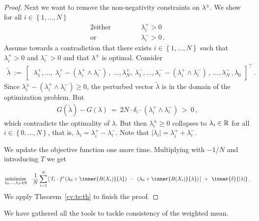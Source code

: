 \begin{proof}
  Next we want to remove the non-negativity constraints on $\lambda^\pm$.
  We show 
  for all $i \in \left\{ 1,\ldots,N \right\}$
\begin{alignat*}{2}
  \text{either}
  &
  &&
  \qquad
      \lambda_i^+ > 0
  \\
  \text{or}
  &
  &&
  \qquad
      \lambda_i^- > 0
  \,.
\end{alignat*}
Assume towards a contradiction that 
there exists
$i \in \left\{ 1,\ldots,N \right\}$
such that
$
      \lambda_i^+ > 0
$
and
$
      \lambda_i^- > 0
$ 
and that 
$\lambda^\pm$ is optimal.
Consider
  \begin{gather}
    \tilde{\lambda}
    \ 
    :=
    \ 
    \begin{bmatrix}
      \ 
      \lambda_1^+,
      \ldots,
      \ 
      \lambda_i^+
      \!
      -
      (
      \lambda_i^+
      \!
      \land
      \lambda_i^-
      )\,,
      \ 
      \ldots,
      \lambda_N^+,
      \ 
      \lambda_1^-,
      \ldots,
      \lambda_i^-
      \!
      -
      (
      \lambda_i^+
      \!
      \land
      \lambda_i^-
      )\,,
      \ 
      \ldots,
      \lambda_N^-
      \,,
      \lambda_0
    \end{bmatrix}
    ^\top
    \,.
  \end{gather}
  Since 
  $
      \lambda_i^\pm
      -
      (
      \lambda_i^+
      \!
      \land
      \lambda_i^-
      )
      \ge 
      0
  $,
  the perturbed vector $\tilde{\lambda}$ is in the domain of the 
  optimization problem.
  But 
  \begin{align}
  G(\tilde{\lambda})
  -
  G(\lambda)
  \ 
  =
  \ 
  2
  N
  \cdot
  \delta_i
  \cdot
      (
      \lambda_i^+
      \!
      \land
      \lambda_i^-
      )
  \ 
  >
  \ 
  0
  \,,
  \end{align}
  which contradicts the optimality of $\lambda$.
But then 
$
\lambda^\pm_i
\ge 0
$
collapses to
$
\lambda_i\in \mathbb{R}
$ 
for all
$i\in \left\{ 0,\ldots,N \right\}$, that is,
$ \lambda_i=\lambda_i^+\!-\lambda_i^- $.
Note that
$ |\lambda_i|=\lambda_i^+\!+\lambda_i^- $.

We update the objective function one more time.
Multiplying with $-1/N$ and introducing $T$ we get

\begin{gather*}
  \underset
  {\lambda_0,\ldots,\lambda_{N}\in \R}
  {
    \mathrm{minimize}
  }
  \quad
  \frac{1}{N}
\sum_{i=1} 
  ^N
  \left[ 
    \,
  T_i
  \cdot
  f^*
  \!
  \left( 
\lambda_0
+
\inner
{B(X_i)}
{\lambda}
  \right)
  \ 
-
\ 
  \left( 
\lambda_0
+
\inner
{B(X_i)}
{\lambda}
  \right)
  \,
  \right]
  \ 
+
\ 
\inner
{\delta}
{|\lambda|}
  \,.
\end{gather*}
We apply Theorem~\ref{cv:ts:th} to finish the proof.
\end{proof}
We have gathered all the tools to tackle consistency of the weighted mean.
